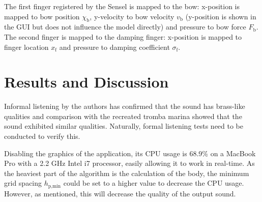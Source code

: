 \documentclass[dvipsnames, pdftex]{article}
\def\stringx{\chi}
\begin{document}
The first finger registered by the Sensel is mapped to the bow: x-position is mapped to bow position $\stringx_\text{b}$, y-velocity to bow velocity $v_\text{b}$ (y-position is shown in the GUI but does not influence the model directly) and pressure to bow force $F_\text{b}$. The second finger is mapped to the damping finger: x-position is mapped to finger location $x_\text{f}$ and pressure to damping coefficient $\sigma_\text{f}$.

\section{Results and Discussion}\label{sec:resDisc}
Informal listening by the authors has confirmed that the sound has brass-like qualities and comparison with the recreated tromba marina showed that the sound exhibited similar qualities. Naturally, formal listening tests need to be conducted to verify this.

Disabling the graphics of the application, its CPU usage is 68.9\% on a MacBook Pro with a 2.2 GHz Intel i7 processor, easily allowing it to work in real-time. As the heaviest part of the algorithm is the calculation of the body, the minimum grid spacing $h_{\text{p},\text{min}}$ could be set to a higher value to decrease the CPU usage. However, as mentioned, this will decrease the quality of the output sound.
\end{document}
